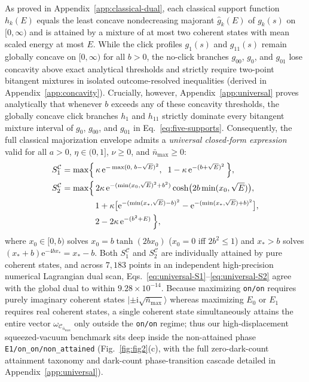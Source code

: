 \documentclass{iopjournal}
\newcommand{\Cset}{\mathcal{C}}
\newcommand{\nbar}{\bar n_{\max}}
\newcommand{\ket}[1]{\lvert #1\rangle}
\newcommand{\ii}{\mathrm{i}}
\newcommand{\ee}{\mathrm{e}}
\begin{document}
As proved in Appendix~\ref{app:classical-dual}, each classical support function $h_k(E)$ equals the least concave nondecreasing majorant $\widehat{g}_k(E)$ of $g_k(s)$ on $[0,\infty)$ and is attained by a mixture of at most two coherent states with mean scaled energy at most $E$. While the click profiles $g_1(s)$ and $g_{11}(s)$ remain globally concave on $[0,\infty)$ for all $b > 0$, the no-click branches $g_{00}$, $g_0$, and $g_{01}$ lose concavity above exact analytical thresholds and strictly require two-point bitangent mixtures in isolated outcome-resolved inequalities (derived in Appendix~\ref{app:concavity}). Crucially, however, Appendix~\ref{app:universal} proves analytically that whenever $b$ exceeds any of these concavity thresholds, the globally concave click branches $h_1$ and $h_{11}$ strictly dominate every bitangent mixture interval of $g_0$, $g_{00}$, and $g_{01}$ in Eq.~\eqref{eq:five-supports}. Consequently, the full classical majorization envelope admits a \emph{universal closed-form expression} valid for all $a > 0$, $\eta \in (0,1]$, $\nu \ge 0$, and $\nbar \ge 0$:
\begin{align}
S_1^{\Cset} &= \max\Bigl\{\,\kappa\,\ee^{-\max(0,\; b-\sqrt{E})^2},\;\; 1 - \kappa\,\ee^{-(b+\sqrt{E})^2}\,\Bigr\}, \label{eq:universal-S1}\\
S_2^{\Cset} &= \max\Bigl\{\,2\kappa\,\ee^{-(\min(x_0,\sqrt{E})^2 + b^2)}\cosh\bigl(2b\min(x_0,\sqrt{E})\bigr), \nonumber\\
&\qquad\qquad 1 + \kappa\bigl[\ee^{-(\min(x_*,\sqrt{E})-b)^2} - \ee^{-(\min(x_*,\sqrt{E})+b)^2}\bigr], \nonumber\\
&\qquad\qquad 2 - 2\kappa\,\ee^{-(b^2+E)}\,\Bigr\}, \label{eq:universal-S2}
\end{align}
where $x_0 \in [0,b)$ solves $x_0 = b\tanh(2bx_0)$ ($x_0 = 0$ iff $2b^2 \le 1$) and $x_* > b$ solves $(x_*+b)\ee^{-4bx_*} = x_* - b$. Both $S_1^{\Cset}$ and $S_2^{\Cset}$ are individually attained by pure coherent states, and across $7{,}183$ points in an independent high-precision numerical Lagrangian dual scan, Eqs.~\eqref{eq:universal-S1}--\eqref{eq:universal-S2} agree with the global dual to within $9.28 \times 10^{-14}$. Because maximizing \texttt{on/on} requires purely imaginary coherent states $\ket{\pm\ii\sqrt{\nbar}}$ whereas maximizing $E_0$ or $E_1$ requires real coherent states, a single coherent state simultaneously attains the entire vector $\omega_{\Cset_{\nbar}}$ only outside the \texttt{on/on} regime; thus our high-displacement squeezed-vacuum benchmark sits deep inside the non-attained phase \texttt{E1/on\_on/non\_attained} (Fig.~\ref{fig:fig2}(c), with the full zero-dark-count attainment taxonomy and dark-count phase-transition cascade detailed in Appendix~\ref{app:universal}).
\end{document}
